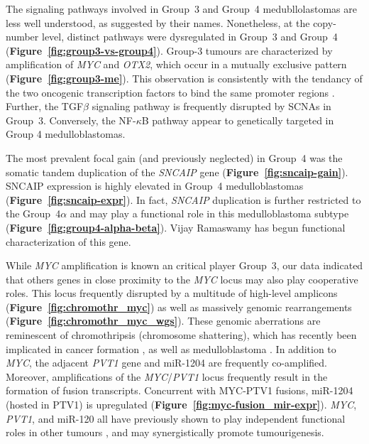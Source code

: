 \documentclass[11pt,letterpaper]{article}
\theoremstyle{definition}
\begin{document}
The signaling pathways involved in Group~3 and Group~4 medubllolastomas are less well understood, as suggested by their names. Nonetheless, at the copy-number level, distinct pathways were dysregulated in Group~3 and Group~4 (\textbf{Figure~\ref{fig:group3-vs-group4}}). Group-3 tumours are characterized by amplification of \emph{MYC} and \emph{OTX2}, which occur in a mutually exclusive pattern (\textbf{Figure~\ref{fig:group3-me}}). This observation is consistently with the tendancy of the two oncogenic transcription factors to bind the same promoter regions . Further, the TGF$\beta$ signaling pathway is frequently disrupted by SCNAs in Group~3. Conversely, the NF-$\kappa$B pathway appear to genetically targeted in Group 4 medulloblastomas.

The most prevalent focal gain (and previously neglected) in Group~4 was the somatic tandem duplication of the \emph{SNCAIP} gene (\textbf{Figure~\ref{fig:sncaip-gain}}). SNCAIP expression is highly elevated in Group~4 medulloblastomas (\textbf{Figure~\ref{fig:sncaip-expr}}). In fact, \emph{SNCAIP} duplication is further restricted to the Group~4$\alpha$ and may play a functional role in this medulloblastoma subtype (\textbf{Figure~\ref{fig:group4-alpha-beta}}). Vijay Ramaswamy has begun functional characterization of this gene.

While \emph{MYC} amplification is known an critical player Group~3, our data indicated that others genes in close proximity to the \emph{MYC} locus may also play cooperative roles. This locus frequently disrupted by a multitude of high-level amplicons (\textbf{Figure~\ref{fig:chromothr_myc}}) as well as massively genomic rearrangements (\textbf{Figure~\ref{fig:chromothr_myc_wgs}}). These genomic aberrations are reminescent of chromothripsis (chromosome shattering), which has recently been implicated in cancer formation , as well as medulloblastoma . In addition to \emph{MYC}, the adjacent \emph{PVT1} gene and miR-1204 are frequently co-amplified. Moreover, amplifications of the \emph{MYC}/\emph{PVT1} locus frequently result in the formation of fusion transcripts. Concurrent with MYC-PTV1 fusions, miR-1204 (hosted in PTV1) is upregulated (\textbf{Figure~\ref{fig:myc-fusion_mir-expr}}). \emph{MYC}, \emph{PVT1}, and miR-120 all have previously shown to play independent functional roles in other tumours , and may synergistically promote tumourigenesis.
\end{document}

